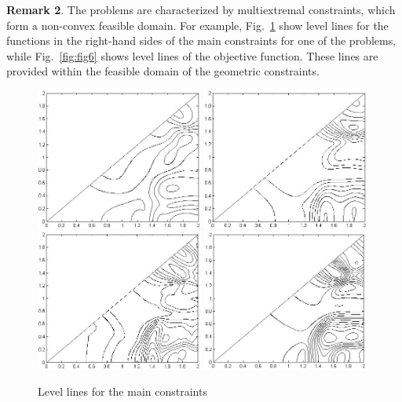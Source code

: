 \documentclass{llncs}
\begin{document}
\textbf{Remark 2}. The problems are characterized by multiextremal constraints, which form a non-convex feasible domain. For example, Fig.~\ref{fig:fig2} show level lines for the functions in the right-hand sides of the main constraints for one of the problems, while Fig.~\ref{fig:fig6} shows level lines of the objective function. These lines are provided within the feasible domain of the geometric constraints.
\begin{figure}
	\centering
		\hfil\includegraphics[width=0.49\textwidth]{fig2.JPG}
		\hfil %
		\includegraphics[width=0.490\textwidth]{fig3.JPG}
		\\[3ex] \hfil%
		\includegraphics[width=0.490\textwidth]{fig4.JPG}
		\hfil %
		\includegraphics[width=0.490\textwidth]{fig5.JPG}
		\hfil
	\caption{Level lines for the main constraints} \label{fig:fig2}	
\end{figure}
\end{document}
